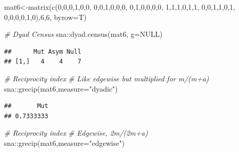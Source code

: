 \documentclass[
  notitlepage,
  onecolumn,
  openany]{book}
\newenvironment{Shaded}{\begin{snugshade}}{\end{snugshade}}
\newcommand{\AttributeTok}[1]{\textcolor[rgb]{0.77,0.63,0.00}{#1}}
\newcommand{\CommentTok}[1]{\textcolor[rgb]{0.56,0.35,0.01}{\textit{#1}}}
\newcommand{\ConstantTok}[1]{\textcolor[rgb]{0.00,0.00,0.00}{#1}}
\newcommand{\DecValTok}[1]{\textcolor[rgb]{0.00,0.00,0.81}{#1}}
\newcommand{\FunctionTok}[1]{\textcolor[rgb]{0.00,0.00,0.00}{#1}}
\newcommand{\NormalTok}[1]{#1}
\newcommand{\OtherTok}[1]{\textcolor[rgb]{0.56,0.35,0.01}{#1}}
\newcommand{\SpecialCharTok}[1]{\textcolor[rgb]{0.00,0.00,0.00}{#1}}
\newcommand{\StringTok}[1]{\textcolor[rgb]{0.31,0.60,0.02}{#1}}
\begin{document}
\begin{Shaded}
\begin{Highlighting}[]
\NormalTok{mat6}\OtherTok{\textless{}{-}}\FunctionTok{matrix}\NormalTok{(}\FunctionTok{c}\NormalTok{(}\DecValTok{0}\NormalTok{,}\DecValTok{0}\NormalTok{,}\DecValTok{0}\NormalTok{,}\DecValTok{1}\NormalTok{,}\DecValTok{0}\NormalTok{,}\DecValTok{0}\NormalTok{,}
               \DecValTok{0}\NormalTok{,}\DecValTok{0}\NormalTok{,}\DecValTok{1}\NormalTok{,}\DecValTok{0}\NormalTok{,}\DecValTok{0}\NormalTok{,}\DecValTok{0}\NormalTok{,}
               \DecValTok{0}\NormalTok{,}\DecValTok{1}\NormalTok{,}\DecValTok{0}\NormalTok{,}\DecValTok{0}\NormalTok{,}\DecValTok{0}\NormalTok{,}\DecValTok{0}\NormalTok{,}
               \DecValTok{1}\NormalTok{,}\DecValTok{1}\NormalTok{,}\DecValTok{1}\NormalTok{,}\DecValTok{0}\NormalTok{,}\DecValTok{1}\NormalTok{,}\DecValTok{1}\NormalTok{,}
               \DecValTok{0}\NormalTok{,}\DecValTok{0}\NormalTok{,}\DecValTok{1}\NormalTok{,}\DecValTok{1}\NormalTok{,}\DecValTok{0}\NormalTok{,}\DecValTok{1}\NormalTok{,}
               \DecValTok{0}\NormalTok{,}\DecValTok{0}\NormalTok{,}\DecValTok{0}\NormalTok{,}\DecValTok{0}\NormalTok{,}\DecValTok{1}\NormalTok{,}\DecValTok{0}\NormalTok{),}\DecValTok{6}\NormalTok{,}\DecValTok{6}\NormalTok{, }\AttributeTok{byrow=}\NormalTok{T)}

\CommentTok{\# Dyad Census}
\NormalTok{sna}\SpecialCharTok{::}\FunctionTok{dyad.census}\NormalTok{(mat6, }\AttributeTok{g=}\ConstantTok{NULL}\NormalTok{)}
\end{Highlighting}
\end{Shaded}

\begin{verbatim}
##      Mut Asym Null
## [1,]   4    4    7
\end{verbatim}

\begin{Shaded}
\begin{Highlighting}[]
\CommentTok{\# Reciprocity index}
\CommentTok{\# Like edgewise but multiplied for m/(m+a)}
\NormalTok{sna}\SpecialCharTok{::}\FunctionTok{grecip}\NormalTok{(mat6,}\AttributeTok{measure=}\StringTok{"dyadic"}\NormalTok{)}
\end{Highlighting}
\end{Shaded}

\begin{verbatim}
##       Mut 
## 0.7333333
\end{verbatim}

\begin{Shaded}
\begin{Highlighting}[]
\CommentTok{\# Reciprocity index}
\CommentTok{\# Edgewise, 2m/(2m+a)}
\NormalTok{sna}\SpecialCharTok{::}\FunctionTok{grecip}\NormalTok{(mat6,}\AttributeTok{measure=}\StringTok{"edgewise"}\NormalTok{)}
\end{Highlighting}
\end{Shaded}
\end{document}

